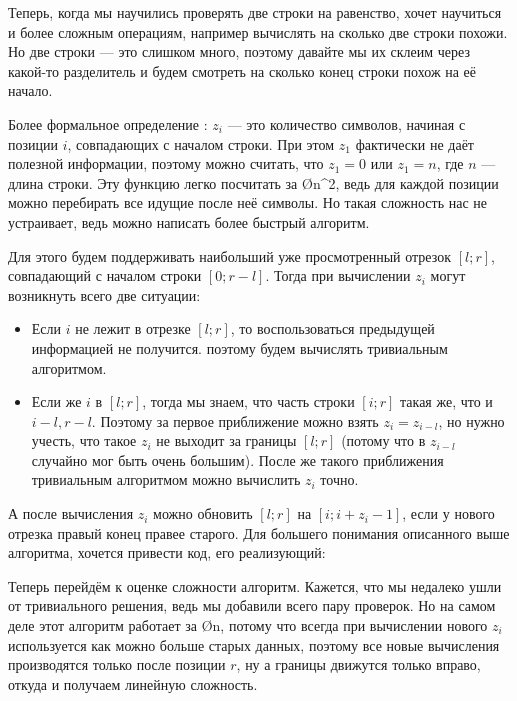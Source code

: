 Теперь, когда мы научились проверять две строки на равенство, хочет научиться и более сложным операциям, например вычислять на сколько две строки похожи. Но две строки — это слишком много, поэтому давайте мы их склеим через какой-то разделитель и будем смотреть на сколько конец строки похож на её начало.

Более формальное определение : $z_i$ — это количество символов, начиная с позиции $i$, совпадающих с началом строки. При этом $z_1$ фактически не даёт полезной информации, поэтому можно считать, что $z_1 = 0$ или $z_1 = n$, где $n$ — длина строки. Эту функцию легко посчитать за \O{n^2}, ведь для каждой позиции можно перебирать все идущие после неё символы. Но такая сложность нас не устраивает, ведь можно написать более быстрый алгоритм.

Для этого будем поддерживать наибольший уже просмотренный отрезок $[l; r]$, совпадающий с началом строки $[0; r - l]$. Тогда при вычислении $z_i$ могут возникнуть всего две ситуации:

\begin{itemize}
    \item Если $i$ не лежит в отрезке $[l; r]$, то воспользоваться предыдущей информацией не получится. поэтому будем вычислять тривиальным алгоритмом.
    \item Если же $i$ в $[l; r]$, тогда мы знаем, что часть строки $[i; r]$ такая же, что и $i - l, r - l$. Поэтому за первое приближение можно взять $z_i = z_{i - l}$, но нужно учесть, что такое $z_i$ не выходит за границы $[l; r]$ (потому что в $z_{i - l}$ случайно мог быть очень большим). После же такого приближения тривиальным алгоритмом можно вычислить $z_i$ точно. 
\end{itemize}

А после вычисления $z_i$ можно обновить $[l; r]$ на $[i; i + z_i - 1]$, если у нового отрезка правый конец правее старого. Для большего понимания описанного выше алгоритма, хочется привести код, его реализующий:


Теперь перейдём к оценке сложности алгоритм. Кажется, что мы недалеко ушли от тривиального решения, ведь мы добавили всего пару проверок. Но на самом деле этот алгоритм работает за \O{n}, потому что всегда при вычислении нового $z_i$ используется как можно больше старых данных, поэтому все новые вычисления производятся только после позиции $r$, ну а границы движутся только вправо, откуда и получаем линейную сложность.

